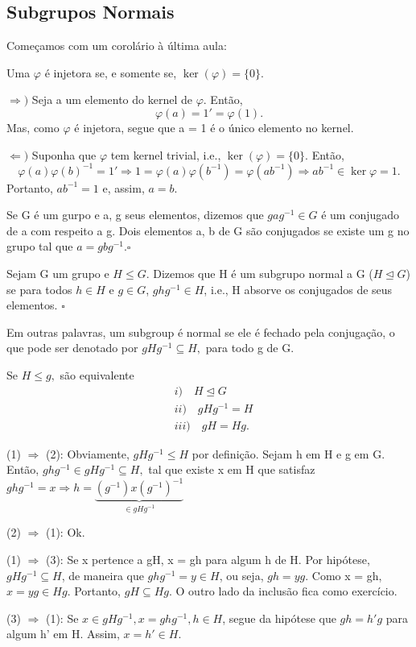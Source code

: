 \documentclass[Algebra/algebra_notes.tex]{subfiles}
\begin{document}
\subsection{Subgrupos Normais}
Começamos com um corolário \`a última aula:
\begin{crl*}
	Uma $\varphi$ é injetora se, e somente se, $\ker{(\varphi)} =\{0\}.$
\end{crl*}
\begin{proof*}
	$ \Rightarrow)$ Seja a um elemento do kernel de $\varphi$. Então,
	$$
		\varphi(a) = 1' = \varphi(1).
	$$
	Mas, como $\varphi$ é injetora, segue que a = 1 é o único elemento no kernel.

	$ \Leftarrow)$ Suponha que $\varphi$ tem kernel trivial, i.e., $\ker{(\varphi)} =\{0\}.$ Então,
	$$
		\varphi(a)\varphi(b)^{-1} = 1' \Rightarrow 1 = \varphi(a)\varphi(b^{-1}) = \varphi(ab^{-1}) \Rightarrow ab^{-1}\in\ker{\varphi} = {1}.
	$$
	Portanto, $ab^{-1} = 1$ e, assim, $a = b.$ \qedsymbol
\end{proof*}
\begin{def*}
	Se G é um gurpo e a, g seus elementos, dizemos que $gag^{-1}\in G$ é um conjugado de a com respeito a g. Dois elementos a, b
	de G são conjugados se existe um g no grupo tal que $a = g b g^{-1}.\square$
\end{def*}
\begin{def*}
	Sejam G um grupo e $H\leq{G}$. Dizemos que H é um subgrupo normal a G ($H\trianglelefteq G$) se para todos $h\in H$ e $g\in G$,
	$ghg^{-1}\in H$, i.e., H absorve os conjugados de seus elementos. $\square$
\end{def*}
Em outras palavras, um subgroup é normal se ele é fechado pela conjugação, o que pode ser denotado por $gHg^{-1}\subseteq{H},$ para todo
g de G.
\begin{prop*}
	Se $H\leq{g},$ são equivalente
	\begin{align*}
		 & i)\quad H\trianglelefteq{G} \\
		 & ii)\quad gHg^{-1} = H       \\
		 & iii)\quad gH = Hg.
	\end{align*}
\end{prop*}
\begin{proof*}
	(1) $ \Rightarrow$ (2): Obviamente, $gHg^{-1}\leq{H}$ por definição. Sejam h em H e g em G. Então, $ghg^{-1}\in gHg^{-1}\subseteq{H},$
	tal que existe x em H que satisfaz $ghg^{-1} = x \Rightarrow h = \underbrace{(g^{-1})x(g^{-1})^{-1}}_{\in gHg^{-1}}$

	(2) $ \Rightarrow$ (1): Ok.

	(1) $ \Rightarrow$ (3): Se x pertence a gH, x = gh para algum h de H. Por hipótese, $gHg^{-1}\subseteq{H}$, de maneira que
	$ghg^{-1} = y\in H$, ou seja, $gh = yg.$ Como x = gh, $x = yg\in Hg$. Portanto, $gH\subseteq{Hg}.$ O outro lado da inclusão fica como exercício.

	(3) $\Rightarrow$ (1): Se $x\in gHg^{-1}, x = ghg^{-1}, h\in H$, segue da hipótese que $gh = h'g$ para algum h' em H. Assim,
	$x = h'\in H.$ \qedsymbol
\end{proof*}
\end{document}
